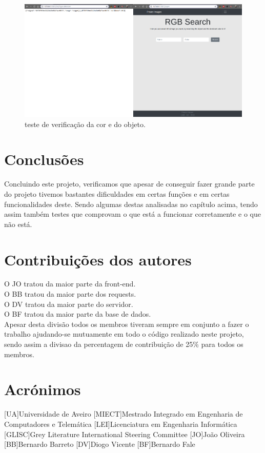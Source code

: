 \documentclass{report}
\begin{document}
\begin{figure}
  \includegraphics[width=\linewidth]{teste2.png}
  \caption{teste de verificação da cor e do objeto.}
  \label{teste de verificação da cor e do objeto}
\end{figure}



\chapter{Conclusões}
\label{chap.conclusao}
Concluindo este projeto, verificamos que apesar de conseguir fazer grande parte do projeto tivemos bastantes dificuldades em certas funções e em certas funcionalidades deste.
Sendo algumas destas analisadas no capítulo acima, tendo assim também testes que comprovam o que está a funcionar corretamente e o que não está.

\chapter*{Contribuições dos autores}
O \ac{JO} tratou da maior parte da front-end. \\
O \ac{BB} tratou da maior parte dos requests.\\
O \ac{DV} tratou da maior parte do servidor.\\
O \ac{BF} tratou da maior parte da base de dados.\\
Apesar desta divisão todos os membros tiveram sempre em conjunto a fazer o trabalho ajudando-se mutuamente em todo o código realizado neste projeto, sendo assim a divisao da percentagem de contribuição de 25\% para todos os membros.

\chapter*{Acrónimos}
\begin{acronym}
[UA]{Universidade de Aveiro}
[MIECT]{Mestrado Integrado em Engenharia de Computadores e Telemática}
[LEI]{Licenciatura em Engenharia Informática}
[GLISC]{Grey Literature International Steering Committee}
[JO]{João Oliveira}
[BB]{Bernardo Barreto}
[DV]{Diogo Vicente}
[BF]{Bernardo Fale}
\end{acronym}


\printbibliography
\end{document}
